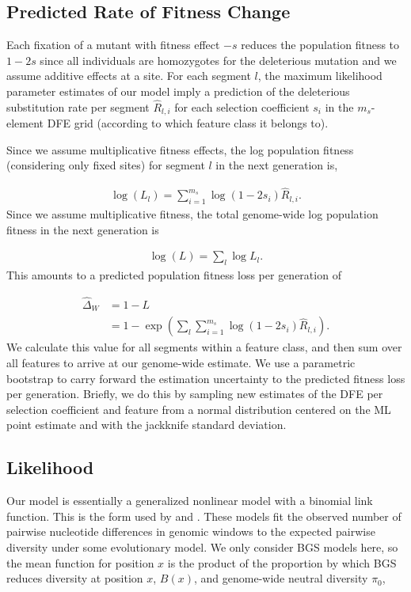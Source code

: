 \documentclass[11pt]{article}
\begin{document}
\subsection{Predicted Rate of Fitness Change}

Each fixation of a mutant with fitness effect $-s$ reduces the population
fitness to $1-2s$ since all individuals are homozygotes for the deleterious
mutation and we assume additive effects at a site. For each segment $l$, the
maximum likelihood parameter estimates of our model imply a prediction of the
deleterious substitution rate per segment $\widehat{R}_{l,i}$ for each
selection coefficient $s_i$ in the $m_s$-element DFE grid (according to which
feature class it belongs to).

Since we assume multiplicative fitness effects, the log population fitness
(considering only fixed sites) for segment $l$ in the next generation is,

\begin{align}
    \log(L_{l}) = \sum_{i=1}^{m_s} \log(1-2 s_i) \widehat{R}_{l,i}.
\end{align}
%
Since we assume multiplicative fitness, the total genome-wide log population
fitness in the next generation is

\begin{align}
    \log(L) = \sum_{l} \log{L_l}.
\end{align}
%
This amounts to a predicted population fitness loss per generation of

\begin{align}
    \widehat{\Delta}_W &= 1 - L \\  \nonumber
             &= 1 - \exp\left(\sum_{l} \sum_{i=1}^{m_s} \log(1-2s_i) \widehat{R}_{l,i} \right).
\end{align}
%
We calculate this value for all segments within a feature class, and then sum
over all features to arrive at our genome-wide estimate. We use a parametric
bootstrap to carry forward the estimation uncertainty to the predicted fitness
loss per generation. Briefly, we do this by sampling new estimates of the DFE
per selection coefficient and feature from a normal distribution centered on
the ML point estimate and with the jackknife standard deviation.

\subsection{Likelihood}

Our model is essentially a generalized nonlinear model with a binomial link
function. This is the form used by \textcite{Elyashiv2016-vt} and
\textcite{Murphy2022-sj}. These models fit the observed number of pairwise
nucleotide differences in genomic windows to the expected pairwise diversity
under some evolutionary model. We only consider BGS models here, so the mean
function for position $x$ is the product of the proportion by which BGS reduces
diversity at position $x$, $B(x)$, and genome-wide neutral diversity $\pi_0$,
\end{document}
